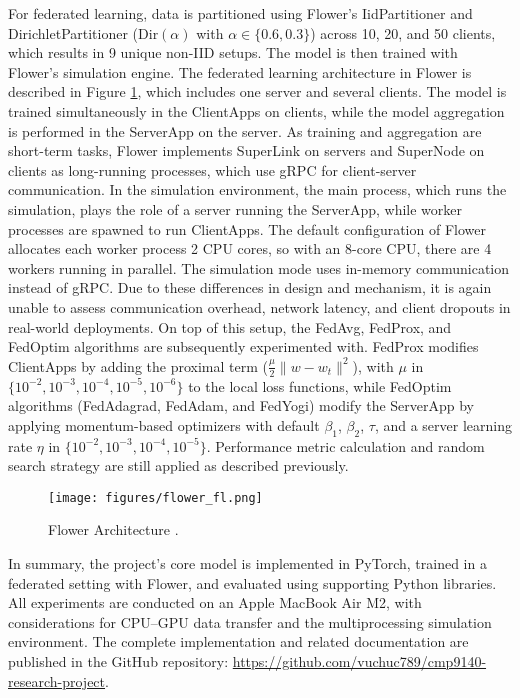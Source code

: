 For federated learning, data is partitioned using Flower's IidPartitioner and DirichletPartitioner ($\text{Dir}(\alpha)$ with $\alpha \in \{0.6, 0.3\}$) across 10, 20, and 50 clients, which results in 9 unique non-IID setups. The model is then trained with Flower's simulation engine. The federated learning architecture in Flower is described in Figure \ref{fig:flower_fl}, which includes one server and several clients. The model is trained simultaneously in the ClientApps on clients, while the model aggregation is performed in the ServerApp on the server. As training and aggregation are short-term tasks, Flower implements SuperLink on servers and SuperNode on clients as long-running processes, which use gRPC for client-server communication. In the simulation environment, the main process, which runs the simulation, plays the role of a server running the ServerApp, while worker processes are spawned to run ClientApps. The default configuration of Flower allocates each worker process 2 CPU cores, so with an 8-core CPU, there are 4 workers running in parallel. The simulation mode uses in-memory communication instead of gRPC. Due to these differences in design and mechanism, it is again unable to assess communication overhead, network latency, and client dropouts in real-world deployments. On top of this setup, the FedAvg, FedProx, and FedOptim algorithms are subsequently experimented with. FedProx modifies ClientApps by adding the proximal term ($\frac{\mu}{2} \lVert w - w_t \rVert^{2}$), with $\mu$ in $\{10^{-2}, 10^{-3}, 10^{-4}, 10^{-5}, 10^{-6}\}$ to the local loss functions, while FedOptim algorithms (FedAdagrad, FedAdam, and FedYogi) modify the ServerApp by applying momentum-based optimizers with default $\beta_1$, $\beta_2$, $\tau$, and a server learning rate $\eta$ in $\{10^{-2}, 10^{-3}, 10^{-4}, 10^{-5}\}$. Performance metric calculation and random search strategy are still applied as described previously.

\begin{figure}[h]
    \centering
    \texttt{[image: figures/flower\_fl.png]}
    \caption{Flower Architecture \citep{flower-architecture}.}
    \label{fig:flower_fl}
\end{figure}

In summary, the project’s core model is implemented in PyTorch, trained in a federated setting with Flower, and evaluated using supporting Python libraries. All experiments are conducted on an Apple MacBook Air M2, with considerations for CPU–GPU data transfer and the multiprocessing simulation environment. The complete implementation and related documentation are published in the GitHub repository: \url{https://github.com/vuchuc789/cmp9140-research-project}.
